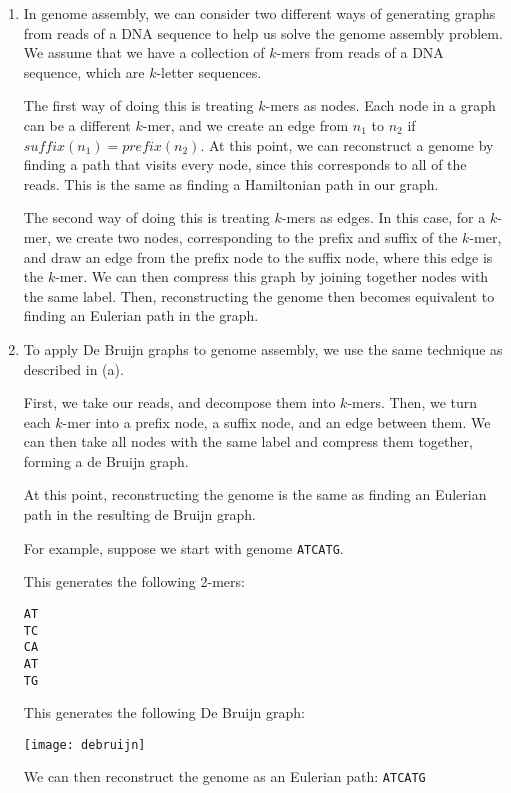 


\begin{enumerate}[label=(\alph*)]
  \item
    In genome assembly, we can consider two different ways of generating graphs from reads of a DNA sequence to help us solve the genome assembly problem. We assume that we have a collection of $k$-mers from reads of a DNA sequence, which are $k$-letter sequences.

    The first way of doing this is treating $k$-mers as nodes. Each node in a graph can be a different $k$-mer, and we create an edge from $n_1$ to $n_2$ if $suffix(n_1) = prefix(n_2)$. At this point, we can reconstruct a genome by finding a path that visits every node, since this corresponds to all of the reads. This is the same as finding a Hamiltonian path in our graph.

    The second way of doing this is treating $k$-mers as edges. In this case, for a $k$-mer, we create two nodes, corresponding to the prefix and suffix of the $k$-mer, and draw an edge from the prefix node to the suffix node, where this edge is the $k$-mer. We can then compress this graph by joining together nodes with the same label. Then, reconstructing the genome then becomes equivalent to finding an Eulerian path in the graph.

  \item
    To apply De Bruijn graphs to genome assembly, we use the same technique as described in (a).

    First, we take our reads, and decompose them into $k$-mers. Then, we turn each $k$-mer into a prefix node, a suffix node, and an edge between them. We can then take all nodes with the same label and compress them together, forming a de Bruijn graph.

    At this point, reconstructing the genome is the same as finding an Eulerian path in the resulting de Bruijn graph.

    For example, suppose we start with genome \texttt{ATCATG}.
    
    This generates the following 2-mers:

\begin{verbatim}
AT
TC
CA
AT
TG
\end{verbatim}

This generates the following De Bruijn graph:

\texttt{[image: debruijn]}

We can then reconstruct the genome as an Eulerian path: \texttt{ATCATG}


\end{enumerate}
